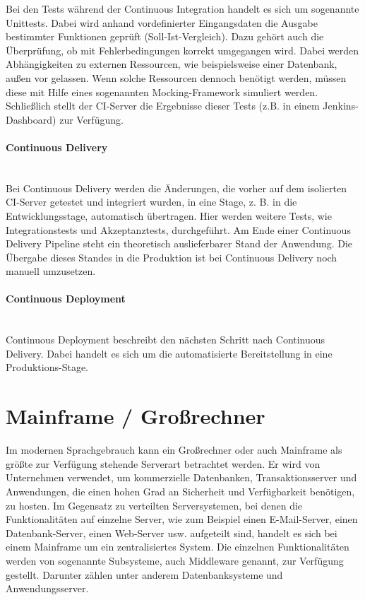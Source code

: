 Bei den Tests während der Continuous Integration handelt es sich um sogenannte \glqq Unittests\grqq.
Dabei wird anhand vordefinierter Eingangsdaten die Ausgabe bestimmter Funktionen geprüft (Soll-Ist-Vergleich).
Dazu gehört auch die Überprüfung, ob mit Fehlerbedingungen korrekt umgegangen wird.
Dabei werden Abhängigkeiten zu externen Ressourcen, wie beispielsweise einer Datenbank, außen vor gelassen.
Wenn solche Ressourcen dennoch benötigt werden, müssen diese mit Hilfe eines sogenannten \glqq Mocking-Framework\grqq{} simuliert werden.
Schließlich stellt der CI-Server die Ergebnisse dieser Tests (z.B. in einem Jenkins-Dashboard) zur Verfügung. 
\cite{Laster.2017}

\paragraph{\glqq Continuous Delivery\grqq}~\\
Bei Continuous Delivery werden die Änderungen, die vorher auf dem isolierten CI-Server getestet und integriert wurden, in eine Stage, z. B. in die Entwicklungsstage, automatisch übertragen.
Hier werden weitere Tests, wie Integrationstests und Akzeptanztests, durchgeführt.
Am Ende einer Continuous Delivery Pipeline steht ein theoretisch auslieferbarer Stand der Anwendung.
Die Übergabe dieses Standes in die Produktion ist bei Continuous Delivery noch manuell umzusetzen.
\cite{Laster.2017}

\paragraph{\glqq Continuous Deployment\grqq}~\\
Continuous Deployment beschreibt den nächsten Schritt nach Continuous Delivery.
Dabei handelt es sich um die automatisierte Bereitstellung in eine Produktions-Stage.
\cite{Laster.2017}

\section{Mainframe / Großrechner}\label{sec:mainframe}
Im modernen Sprachgebrauch kann ein Großrechner oder auch Mainframe als größte zur Verfügung stehende Serverart betrachtet werden.
Er wird von Unternehmen verwendet, um  kommerzielle Datenbanken, Transaktionsserver und Anwendungen, die einen hohen Grad an Sicherheit und Verfügbarkeit benötigen, zu hosten.
Im Gegensatz zu verteilten Serversystemen, bei denen die Funktionalitäten auf einzelne Server, wie zum Beispiel einen E-Mail-Server, einen Datenbank-Server, einen Web-Server usw. aufgeteilt sind, handelt es sich bei einem Mainframe um ein zentralisiertes System.
Die einzelnen Funktionalitäten werden von sogenannte \glqq Subsysteme\grqq, auch \glqq Middleware\grqq{} genannt, zur Verfügung gestellt. 
Darunter zählen unter anderem Datenbanksysteme und Anwendungsserver.
\cite{Ebbers.2011}

